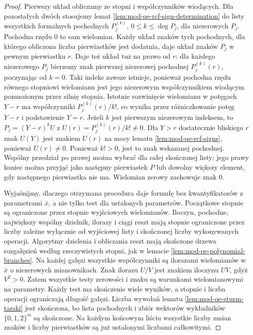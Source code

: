 \begin{proof}
Pierwszy układ obliczamy ze stopni i współczynników
wiodących. Dla pozostałych dwóch stosujemy lemat
\ref{lem:mod-qe-rcf-sign-determination} do listy
wszystkich formalnych pochodnych $P_j^{(k)}$,
$0\leq k\leq\deg P_j$, dla niezerowych $P_j$.
Pochodna rzędu $0$ to sam wielomian.
Każdy układ znaków tych pochodnych, dla którego
obliczona liczba pierwiastków jest dodatnia, daje
układ znaków $P_j$ w pewnym pierwiastku $r$.
Daje też układ tuż na prawo od $r$: dla każdego
niezerowego $P_j$ bierzemy znak pierwszej niezerowej
pochodnej $P_j^{(k)}(r)$, poczynając od $k=0$.
Taki indeks zawsze istnieje, ponieważ pochodna
rzędu równego stopniowi wielomianu jest jego
niezerowym współczynnikiem wiodącym pomnożonym
przez silnię stopnia.
Istotnie rozwinięcie wielomianu w potęgach $Y-r$
ma współczynniki $P_j^{(k)}(r)/k!$, co wynika
przez różniczkowanie potęg $Y-r$ i podstawienie $Y=r$.
Jeżeli $k$ jest pierwszym niezerowym indeksem, to
$P_j=(Y-r)^k U$ z $U(r)=P_j^{(k)}(r)/k!\ne0$.
Dla $Y>r$ dostatecznie bliskiego $r$ znak $U(Y)$
jest znakiem $U(r)$ na mocy lematu
\ref{lem:mod-qe-rcf-signs}, ponieważ $U(r)\ne0$. Ponieważ $k!>0$, jest to
znak wskazanej pochodnej. Wspólny przedział po prawej
można wybrać dla całej skończonej listy; jego
prawy koniec można przyjąć jako następny pierwiastek
$P$ lub dowolny większy element, gdy następnego
pierwiastka nie ma. Wielomian zerowy zachowuje znak $0$.

Wyjaśnijmy, dlaczego otrzymana procedura daje formułę
bez kwantyfikatorów z parametrami $\bar x$, a nie tylko
test dla ustalonych parametrów. Początkowe stopnie
są ograniczone przez stopnie wyjściowych wielomianów.
Iloczyn, pochodne, największy wspólny dzielnik,
ilorazy i ciągi reszt mają stopnie ograniczone
przez liczby zależne wyłącznie od wyjściowej listy
i skończonej liczby wykonywanych operacji.
Algorytmy dzielenia i obliczania reszt mają
skończone drzewa rozgałęzień według rzeczywistych
stopni, jak w lemacie \ref{lem:mod-qe-polynomial-branches}.
Na każdej gałęzi wszystkie współczynniki są ilorazami
wielomianów w $\bar x$ o niezerowych mianownikach.
Znak ilorazu $U/V$ jest znakiem iloczynu $UV$,
gdyż $V^2>0$. Zatem wszystkie testy zerowości i znaku
są warunkami wielomianowymi na parametry. Każdy
test ma skończenie wiele wyników, a stopnie i liczba
operacji ograniczają długość gałęzi. Liczba wywołań
lematu \ref{lem:mod-qe-sturm-tarski} jest skończona,
bo lista pochodnych i zbiór wektorów wykładników
$\{0,1,2\}^m$ są skończone. Na każdym końcowym
liściu wszystkie liczby zmian znaków i liczby
pierwiastków są już ustalonymi liczbami całkowitymi.


\end{proof}
